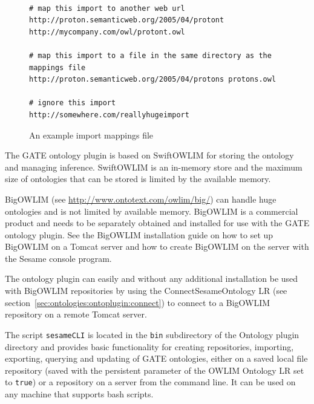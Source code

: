 {\begin{figure}[htbp]
\begin{center}
{\footnotesize
\begin{small}\begin{verbatim}

# map this import to another web url
http://proton.semanticweb.org/2005/04/protont http://mycompany.com/owl/protont.owl

# map this import to a file in the same directory as the mappings file
http://proton.semanticweb.org/2005/04/protons protons.owl

# ignore this import
http://somewhere.com/reallyhugeimport
\end{verbatim}\end{small}
}
\caption{An example import mappings file}
\label{fig:importmappingsfile}
\end{center}
\end{figure}



The GATE ontology plugin is based on SwiftOWLIM for storing the
ontology and managing inference. SwiftOWLIM is an in-memory store
and the maximum size of ontologies that can be stored is limited
by the available memory.

BigOWLIM (see \url{http://www.ontotext.com/owlim/big/}) 
can handle huge ontologies and is not limited
by available memory. BigOWLIM is a commercial product and needs
to be separately obtained and installed for use with the GATE
ontology plugin. See the BigOWLIM installation guide on how to 
set up BigOWLIM on a Tomcat server and how to create BigOWLIM on 
the server with the Sesame console program.

The ontology plugin can easily and without any additional installation
 be used with BigOWLIM repositories by
using the ConnectSesameOntology LR (see section~\ref{sec:ontologies:ontoplugin:connect})
to connect to a BigOWLIM repository on a remote Tomcat server. 


The script \texttt{sesameCLI} is located in the \texttt{bin} subdirectory
of the Ontology plugin directory and provides basic functionality for 
creating repositories, importing, exporting, querying and updating of GATE 
ontologies, either on a saved local file repository (saved with the persistent
  parameter of the OWLIM Ontology LR set to \texttt{true}) or a repository on a 
server from the command line. It can be used on any machine that supports 
bash scripts.

}
